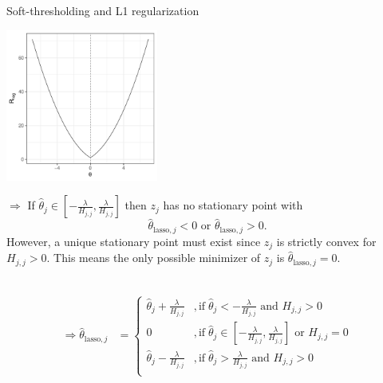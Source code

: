 \documentclass[11pt,compress,t,notes=noshow, xcolor=table]{beamer}
\begin{document}
\begin{vbframe}{Soft-thresholding and L1 regularization}
\begin{minipage}{0.4\textwidth}
    \includegraphics[width=5cm]{figure/th_l1_zero.pdf}
\end{minipage}
\hfill
\begin{minipage}{0.49\textwidth}
$\Rightarrow$ If $\hat{\theta}_j \in [-\frac{\lambda}{H_{j,j}}, \frac{\lambda}{H_{j,j}}]$ then $z_j$ has no stationary point with $$\hat{\theta}_{\text{lasso},j} < 0 \text{ or } \hat{\theta}_{\text{lasso},j} > 0.$$ 
However, a unique stationary point must exist since $z_j$ is strictly convex for $H_{j,j} > 0$. This means the only possible minimizer of $z_j$ is $\hat{\theta}_{\text{lasso},j} = 0$. %
\\
\end{minipage}
 \\

\begin{align*}\Rightarrow \hat{\theta}_{\text{lasso},j} &= \begin{cases} 
     \hat{\theta}_j + \frac{\lambda}{H_{j,j}} &, \text{if}   \;\hat{\theta}_j < -\frac{\lambda}{H_{j,j}} \text{ and } H_{j,j} > 0\\
       0 &, \text{if}   \;\hat{\theta}_j \in [-\frac{\lambda}{H_{j,j}}, \frac{\lambda}{H_{j,j}}] \text{ or } H_{j,j} = 0\\
     \hat{\theta}_j - \frac{\lambda}{H_{j,j}} &, \text{if}   \;\hat{\theta}_j > \frac{\lambda}{H_{j,j}} \text{ and } H_{j,j} > 0 \\
     \end{cases}
     \end{align*}

\end{vbframe}

\endlecture
\end{document}
